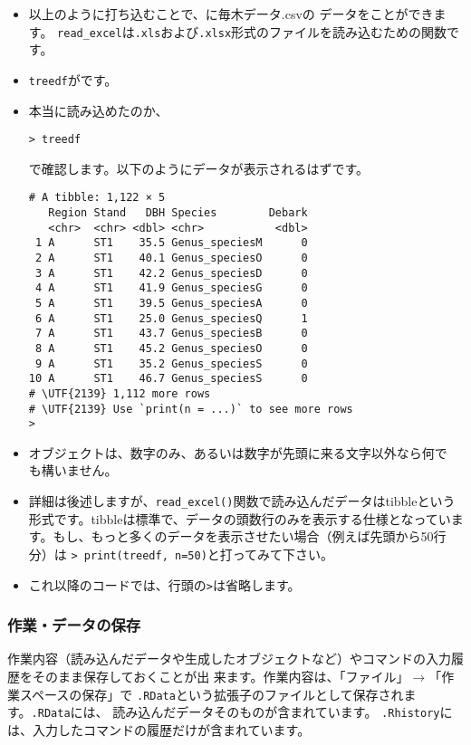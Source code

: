 \begin{itemize}
 \item 以上のように打ち込むことで、に毎木データ.csvの
       データをことができます。
       \verb|read_excel|は\verb|.xls|および\verb|.xlsx|形式のファイルを読み込むための関数です。
 \item \verb|treedf|がです。
 \item 本当に読み込めたのか、

       \verb|> treedf|

       で確認します。以下のようにデータが表示されるはずです。
\begin{verbatim}
# A tibble: 1,122 × 5
   Region Stand   DBH Species        Debark
   <chr>  <chr> <dbl> <chr>           <dbl>
 1 A      ST1    35.5 Genus_speciesM      0
 2 A      ST1    40.1 Genus_speciesO      0
 3 A      ST1    42.2 Genus_speciesD      0
 4 A      ST1    41.9 Genus_speciesG      0
 5 A      ST1    39.5 Genus_speciesA      0
 6 A      ST1    25.0 Genus_speciesQ      1
 7 A      ST1    43.7 Genus_speciesB      0
 8 A      ST1    45.2 Genus_speciesO      0
 9 A      ST1    35.2 Genus_speciesS      0
10 A      ST1    46.7 Genus_speciesS      0
# \UTF{2139} 1,112 more rows
# \UTF{2139} Use `print(n = ...)` to see more rows
> \end{verbatim}
 \item オブジェクトは、数字のみ、あるいは数字が先頭に来る文字以外なら何で
       も構いません。
 \item 詳細は後述しますが、\verb|read_excel()|関数で読み込んだデータはtibbleという形式です。tibbleは標準で、データの頭数行のみを表示する仕様となっています。もし、もっと多くのデータを表示させたい場合（例えば先頭から50行分）は
       \verb|> print(treedf, n=50)|と打ってみて下さい。
 \item これ以降のコードでは、行頭の\verb|>|は省略します。
\end{itemize}

    \subsubsection{作業・データの保存}
作業内容（読み込んだデータや生成したオブジェクトなど）やコマンドの入力履
歴をそのまま保存しておくことが出
来ます。作業内容は、「ファイル」$\rightarrow$「作業スペースの保存」で
\verb|.RData|という拡張子のファイルとして保存されます。\verb|.RData|には、
読み込んだデータそのものが含まれています。
\verb|.Rhistory|には、入力したコマンドの履歴だけが含まれています。

